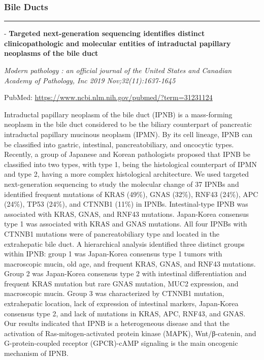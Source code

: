 \documentclass[
]{article}
\renewcommand{\linethickness}{0.05em}
\begin{document}
\pagebreak

\hypertarget{bileducts_molecular}{%
\subsubsection{Bile Ducts}\label{bileducts_molecular}}

\begin{center}\rule{0.5\linewidth}{\linethickness}\end{center}

- \textbf{Targeted next-generation sequencing identifies distinct
clinicopathologic and molecular entities of intraductal papillary
neoplasms of the bile duct}

\emph{Modern pathology : an official journal of the United States and
Canadian Academy of Pathology, Inc 2019 Nov;32(11):1637-1645}

PubMed: \url{https://www.ncbi.nlm.nih.gov/pubmed/?term=31231124}

Intraductal papillary neoplasm of the bile duct (IPNB) is a mass-forming
neoplasm in the bile duct considered to be the biliary counterpart of
pancreatic intraductal papillary mucinous neoplasm (IPMN). By its cell
lineage, IPNB can be classified into gastric, intestinal,
pancreatobiliary, and oncocytic types. Recently, a group of Japanese and
Korean pathologists proposed that IPNB be classified into two types,
with type 1, being the histological counterpart of IPMN and type 2,
having a more complex histological architecture. We used targeted
next-generation sequencing to study the molecular change of 37 IPNBs and
identified frequent mutations of KRAS (49\%), GNAS (32\%), RNF43 (24\%),
APC (24\%), TP53 (24\%), and CTNNB1 (11\%) in IPNBs. Intestinal-type
IPNB was associated with KRAS, GNAS, and RNF43 mutations. Japan-Korea
consensus type 1 was associated with KRAS and GNAS mutations. All four
IPNBs with CTNNB1 mutations were of pancreatobiliary type and located in
the extrahepatic bile duct. A hierarchical analysis identified three
distinct groups within IPNB: group 1 was Japan-Korea consensus type 1
tumors with macroscopic mucin, old age, and frequent KRAS, GNAS, and
RNF43 mutations. Group 2 was Japan-Korea consensus type 2 with
intestinal differentiation and frequent KRAS mutation but rare GNAS
mutation, MUC2 expression, and macroscopic mucin. Group 3 was
characterized by CTNNB1 mutation, extrahepatic location, lack of
expression of intestinal markers, Japan-Korea consensus type 2, and lack
of mutations in KRAS, APC, RNF43, and GNAS. Our results indicated that
IPNB is a heterogeneous disease and that the activation of
Ras-mitogen-activated protein kinase (MAPK), Wnt/β-catenin, and
G-protein-coupled receptor (GPCR)-cAMP signaling is the main oncogenic
mechanism of IPNB.
\end{document}
